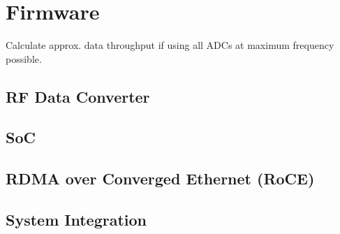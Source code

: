 \section{Firmware}
Calculate approx. data throughput if using all ADCs at maximum frequency possible.
\subsection{RF Data Converter}
\subsection{SoC}
\subsection{RDMA over Converged Ethernet (RoCE)}

\subsection{System Integration}


